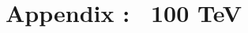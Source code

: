 \clearpage
\newpage

\section{Appendix :  \texorpdfstring{\rsg}{rsg}\ 100 TeV}
\label{appendix:rsg100}


